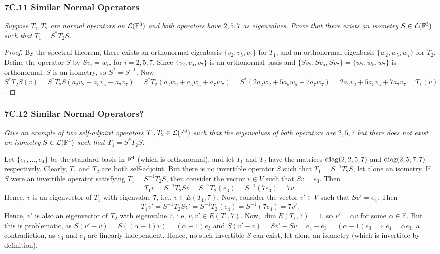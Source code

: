 \documentclass{article}
\begin{document}
\subsubsection*{7C.11 Similar Normal Operators}
\textit{Suppose $T_1,T_2$ are normal operators on $\mathcal L(\mathbb F^3)$ and both operators have $2, 5, 7$ as eigenvalues. Prove that there exists an isometry $S\in\mathcal L(\mathbb F^3)$ such that $T_1 = S^*T_2S$.}
\begin{proof}
By the spectral theorem, there exists an orthonormal eigenbasis $\{v_2, v_5, v_7\}$ for $T_1$, and an orthonormal eigenbasis $\{w_2, w_5, w_7\}$ for $T_2$. Define the operator $S$ by $Sv_i = w_i$, for $i= 2, 5, 7$. Since $\{v_2, v_5, v_7\}$ is an orthonormal basis and $\{Sv_2, Sv_5, Sv_7\} = \{w_2,w_5, w_7\}$ is orthonormal, $S$ is an isometry, so $S^* = S^{-1}$. Now $S^*T_2S(v) = S^*T_2S(a_2v_2 + a_5v_5 + a_7v_7) = S^*T_2(a_2w_2+a_5w_5 + a_7w_7) = S^*(2a_2w_2 + 5a_5w_5 + 7a_7w_7) = 2a_2v_2 + 5a_5v_5 + 7a_7v_7 = T_1(v)$.
\end{proof}

\subsubsection*{7C.12 Similar Normal Operators?}
\textit{Give an example of two self-adjoint operators $T_1, T_2\in \mathcal L(\mathbb F^4)$ such that the eigenvalues of both operators are $2,5,7$ but there does not exist an isometry $S\in\mathcal L( \mathbb F^4)$ such that $T_1 = S^*T_2S$.}
\begin{solution}
Let $\{e_1,\ldots, e_4\}$ be the standard basis in $\mathbb F^4$ (which is orthonormal), and let $T_1$ and $T_2$ have the matrices $\operatorname{diag}(2, 2, 5, 7)$ and $\operatorname{diag}(2, 5, 7, 7)$ respectively. Clearly, $T_1$ and $T_2$ are both self-adjoint. But there is no invertible operator $S$ such that $T_1 = S^{-1}T_2S$, let alone an isometry. If $S$ were an invertible operator satisfying $T_1 = S^{-1}T_2S$, then consider the vector $v\in V$ such that $Sv = e_3$. Then
$$T_1v = S^{-1}T_2Sv = S^{-1}T_2(e_3) = S^{-1}(7e_3) = 7v.$$
Hence, $v$ is an eigenvector of $T_1$ with eigenvalue $7$, i.e., $v\in E(T_1, 7)$. Now, consider the vector $v'\in V$ such that $Sv' = e_4$. Then
$$T_1v' = S^{-1}T_2Sv' = S^{-1}T_2(e_4) = S^{-1}(7e_4) = 7v'.$$
Hence, $v'$ is also an eigenvector of $T_2$ with eigenvalue $7$, i.e, $v, v'\in E(T_1, 7)$. Now, $\dim E(T_1,7) = 1$, so $v' = \alpha v$ for some $\alpha\in \mathbb F$. But this is problematic, as $S(v'-v) = S((\alpha-1)v) = (\alpha-1)e_3$ and $S(v'-v) = Sv'-Sv = e_4-e_3 = (\alpha-1)e_3 \implies e_4 = \alpha e_3$, a contradiction, as $e_3$ and $e_4$ are linearly independent. Hence, no such invertible $S$ can exist, let alone an isometry (which is invertible by definition).
\end{solution}
\end{document}
